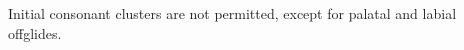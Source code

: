 \documentclass[grammar]{subfiles}
\begin{document}

Initial consonant clusters are not permitted, except for palatal and labial
offglides.

%
%
\end{document}
